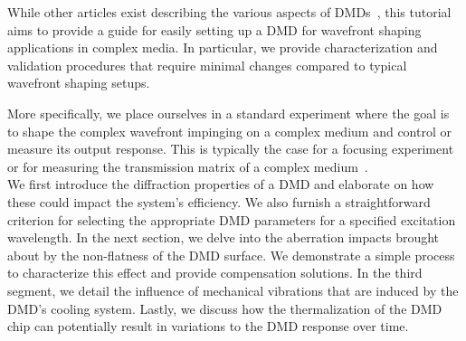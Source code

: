 \documentclass[12pt]{iopart}
\newcommand{\red}[1]{#1}
\begin{document}
While other articles exist describing the various aspects of DMDs~\cite{Park2015properties, Scholes2019structured, Cox2021converting, Wang2023diffraction},
this tutorial aims to provide a guide for easily setting up a DMD for wavefront shaping applications in complex media.
In particular, we provide characterization and validation procedures that require minimal changes compared to typical wavefront shaping setups. 
\red{
More specifically, we place ourselves in a standard experiment where the goal is to shape the complex wavefront impinging on a complex medium and control or measure its output response. 
This is typically the case for a focusing experiment~\cite{Vellekoop2007focusing} or for measuring the transmission matrix of a complex medium~\cite{Popoff2010Measuring}.
}\\
We first introduce the diffraction properties of a DMD
and elaborate on how these could impact the system's efficiency.
We also furnish a straightforward criterion for selecting the appropriate DMD parameters for a specified excitation wavelength.
In the next section,
we delve into the aberration impacts brought about by the non-flatness of the DMD surface.
We demonstrate a simple process to characterize this effect and provide compensation solutions.
In the third segment,
we detail the influence of mechanical vibrations that are induced by the DMD's cooling system.
Lastly, we discuss how the thermalization of the DMD chip can potentially result in variations to the DMD response over time.
\end{document}
